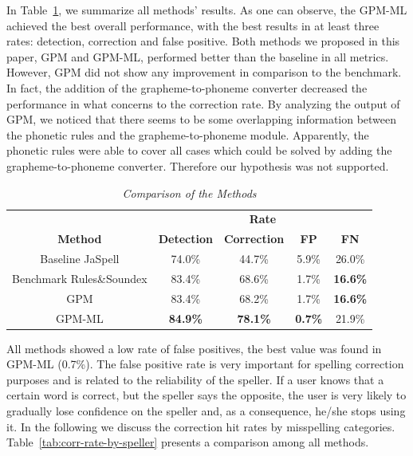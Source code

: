 In Table~\ref{tab:sys-comparison}, we summarize all methods' results. As one can observe, the GPM-ML achieved the best overall performance, with the best results in at least three rates: detection, correction and false positive. Both methods we proposed in this paper, GPM and GPM-ML, performed better than the baseline in all metrics. However, GPM did not show any improvement in comparison to the benchmark. In fact, the addition of the grapheme-to-phoneme converter decreased the performance in what concerns to the correction rate. By analyzing the output of GPM, we noticed that there seems to be some overlapping information between the phonetic rules and the grapheme-to-phoneme module. Apparently, the phonetic rules were able to cover all cases which could be solved by adding the grapheme-to-phoneme converter. Therefore our hypothesis was not supported. 


\begin{table}[!ht]
\centering
\caption{\label{tab:sys-comparison} {\it Comparison of the Methods}}
\begin{tabular}{|ccccc|}
\hline
 & \multicolumn{4}{c|}{\textbf{Rate}} \\ \cline{2-5}
\textbf{Method} & \textbf{Detection} & \textbf{Correction} & \textbf{FP} & \textbf{FN} \\ \hline
Baseline JaSpell & 74.0\% & 44.7\% & 5.9\% & 26.0\% \\
Benchmark Rules\&Soundex & 83.4\% & 68.6\% & 1.7\% & \textbf{16.6\%} \\
GPM & 83.4\% & 68.2\% & 1.7\% & \textbf{16.6\%} \\
GPM-ML  & \textbf{84.9\%} & \textbf{78.1\%} & \textbf{0.7\%} & 21.9\% \\ \hline
\end{tabular}
\end{table}


All methods showed a low rate of false positives, the best value was found in GPM-ML (0.7\%). The false positive rate is very important for spelling correction purposes and is related to the reliability of the speller. 
If a user knows that a certain word is correct, but the speller says the opposite, the user is very likely to gradually lose confidence on the speller and, as a consequence, he/she stops using it.
In the following we discuss the correction hit rates by misspelling categories. Table~\ref{tab:corr-rate-by-speller} presents a comparison among all methods.

